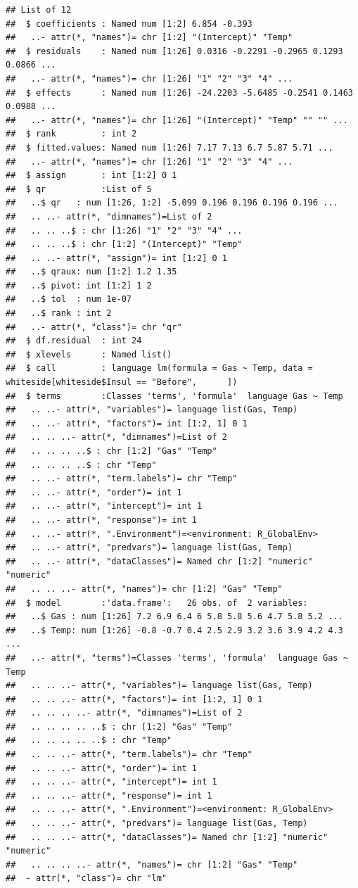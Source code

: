 \documentclass[]{book}
\theoremstyle{definition}
\theoremstyle{definition}
\theoremstyle{remark}
\begin{document}
\begin{verbatim}
## List of 12
##  $ coefficients : Named num [1:2] 6.854 -0.393
##   ..- attr(*, "names")= chr [1:2] "(Intercept)" "Temp"
##  $ residuals    : Named num [1:26] 0.0316 -0.2291 -0.2965 0.1293 0.0866 ...
##   ..- attr(*, "names")= chr [1:26] "1" "2" "3" "4" ...
##  $ effects      : Named num [1:26] -24.2203 -5.6485 -0.2541 0.1463 0.0988 ...
##   ..- attr(*, "names")= chr [1:26] "(Intercept)" "Temp" "" "" ...
##  $ rank         : int 2
##  $ fitted.values: Named num [1:26] 7.17 7.13 6.7 5.87 5.71 ...
##   ..- attr(*, "names")= chr [1:26] "1" "2" "3" "4" ...
##  $ assign       : int [1:2] 0 1
##  $ qr           :List of 5
##   ..$ qr   : num [1:26, 1:2] -5.099 0.196 0.196 0.196 0.196 ...
##   .. ..- attr(*, "dimnames")=List of 2
##   .. .. ..$ : chr [1:26] "1" "2" "3" "4" ...
##   .. .. ..$ : chr [1:2] "(Intercept)" "Temp"
##   .. ..- attr(*, "assign")= int [1:2] 0 1
##   ..$ qraux: num [1:2] 1.2 1.35
##   ..$ pivot: int [1:2] 1 2
##   ..$ tol  : num 1e-07
##   ..$ rank : int 2
##   ..- attr(*, "class")= chr "qr"
##  $ df.residual  : int 24
##  $ xlevels      : Named list()
##  $ call         : language lm(formula = Gas ~ Temp, data = whiteside[whiteside$Insul == "Before",      ])
##  $ terms        :Classes 'terms', 'formula'  language Gas ~ Temp
##   .. ..- attr(*, "variables")= language list(Gas, Temp)
##   .. ..- attr(*, "factors")= int [1:2, 1] 0 1
##   .. .. ..- attr(*, "dimnames")=List of 2
##   .. .. .. ..$ : chr [1:2] "Gas" "Temp"
##   .. .. .. ..$ : chr "Temp"
##   .. ..- attr(*, "term.labels")= chr "Temp"
##   .. ..- attr(*, "order")= int 1
##   .. ..- attr(*, "intercept")= int 1
##   .. ..- attr(*, "response")= int 1
##   .. ..- attr(*, ".Environment")=<environment: R_GlobalEnv> 
##   .. ..- attr(*, "predvars")= language list(Gas, Temp)
##   .. ..- attr(*, "dataClasses")= Named chr [1:2] "numeric" "numeric"
##   .. .. ..- attr(*, "names")= chr [1:2] "Gas" "Temp"
##  $ model        :'data.frame':   26 obs. of  2 variables:
##   ..$ Gas : num [1:26] 7.2 6.9 6.4 6 5.8 5.8 5.6 4.7 5.8 5.2 ...
##   ..$ Temp: num [1:26] -0.8 -0.7 0.4 2.5 2.9 3.2 3.6 3.9 4.2 4.3 ...
##   ..- attr(*, "terms")=Classes 'terms', 'formula'  language Gas ~ Temp
##   .. .. ..- attr(*, "variables")= language list(Gas, Temp)
##   .. .. ..- attr(*, "factors")= int [1:2, 1] 0 1
##   .. .. .. ..- attr(*, "dimnames")=List of 2
##   .. .. .. .. ..$ : chr [1:2] "Gas" "Temp"
##   .. .. .. .. ..$ : chr "Temp"
##   .. .. ..- attr(*, "term.labels")= chr "Temp"
##   .. .. ..- attr(*, "order")= int 1
##   .. .. ..- attr(*, "intercept")= int 1
##   .. .. ..- attr(*, "response")= int 1
##   .. .. ..- attr(*, ".Environment")=<environment: R_GlobalEnv> 
##   .. .. ..- attr(*, "predvars")= language list(Gas, Temp)
##   .. .. ..- attr(*, "dataClasses")= Named chr [1:2] "numeric" "numeric"
##   .. .. .. ..- attr(*, "names")= chr [1:2] "Gas" "Temp"
##  - attr(*, "class")= chr "lm"
\end{verbatim}
\end{document}
